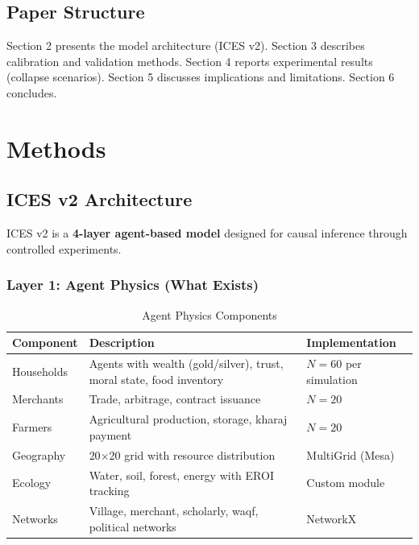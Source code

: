 \documentclass[12pt,a4paper]{article}
\begin{document}
\subsection{Paper Structure}

Section 2 presents the model architecture (ICES v2). Section 3 describes calibration and validation methods. Section 4 reports experimental results (collapse scenarios). Section 5 discusses implications and limitations. Section 6 concludes.

\section{Methods}

\subsection{ICES v2 Architecture}

ICES v2 is a \textbf{4-layer agent-based model} designed for causal inference through controlled experiments.

\subsubsection{Layer 1: Agent Physics (What Exists)}

\begin{table}[H]
\centering
\caption{Agent Physics Components}
\label{tab:layer1}
\begin{tabular}{p{3cm} p{5cm} p{5cm}}
\toprule
\textbf{Component} & \textbf{Description} & \textbf{Implementation} \\
\midrule
Households & Agents with wealth (gold/silver), trust, moral state, food inventory & $N = 60$ per simulation \\
Merchants & Trade, arbitrage, contract issuance & $N = 20$ \\
Farmers & Agricultural production, storage, kharaj payment & $N = 20$ \\
Geography & 20$\times$20 grid with resource distribution & MultiGrid (Mesa) \\
Ecology & Water, soil, forest, energy with EROI tracking & Custom module \\
Networks & Village, merchant, scholarly, waqf, political networks & NetworkX \\
\bottomrule
\end{tabular}
\end{table}
\end{document}
